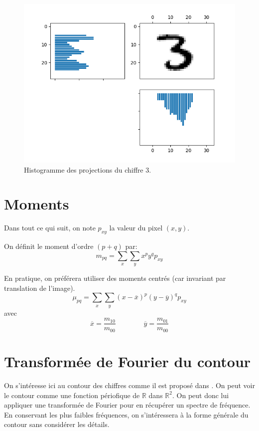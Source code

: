 \begin{figure}[h]
  \centering
  \includegraphics[scale=0.5]{assets/features-hvhisto-ex1}
  \caption{Histogramme des projections du chiffre 3.}
  \label{fig:features-hvhisto-ex1}
\end{figure}



\section{Moments}



Dans tout ce qui suit, on note $p_{xy}$ la valeur du pixel $(x,y)$.

On définit le moment d'ordre $(p+q)$ par:
\[
m_{pq} = \sum_x \sum_y x^p y^q p_{xy}
\]

En pratique, on préférera utiliser des moments centrés (car invariant 
par translation de l'image).
\[
\mu_{pq} = \sum_x \sum_y (x - \overline{x})^p (y - \overline{y})^q p_{xy}
\]
avec 
\[
\overline{x} = \frac{m_{10}}{m_{00}} \qquad \qquad \overline{y} = \frac{m_{01}}{m_{00}}
\]



\section{Transformée de Fourier du contour}

On s'intéresse ici au contour des chiffres comme il est proposé dans \cite{EllipticFourierFeatures}. 
On peut voir le contour comme une fonction périofique 
de $\mathbb{R}$ dans $\mathbb{R}^2$. 
On peut donc lui appliquer une transformée de Fourier pour 
en récupérer un spectre de fréquence. 
En conservant les plus faibles fréquences, on s'intéressera à 
la forme générale du contour sans considérer les détails.

